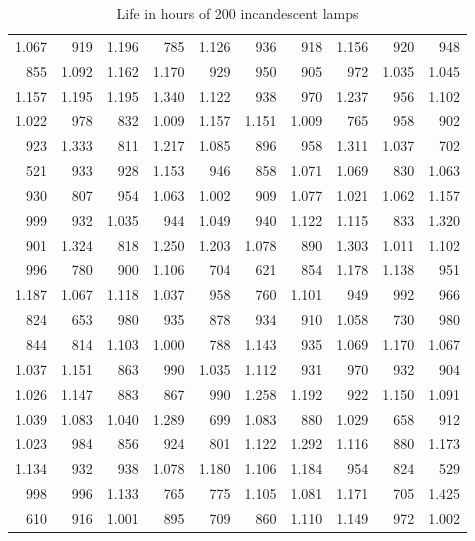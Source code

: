\begin{table}[H]
  \centering
  \begin{tabular}{rrrrrrrrrr}
    1.067 & 919   & 1.196 & 785   & 1.126 & 936   & 918   & 1.156 & 920   & 948   \\
    855   & 1.092 & 1.162 & 1.170 & 929   & 950   & 905   & 972   & 1.035 & 1.045 \\
    1.157 & 1.195 & 1.195 & 1.340 & 1.122 & 938   & 970   & 1.237 & 956   & 1.102 \\
    1.022 & 978   & 832   & 1.009 & 1.157 & 1.151 & 1.009 & 765   & 958   & 902   \\
    923   & 1.333 & 811   & 1.217 & 1.085 & 896   & 958   & 1.311 & 1.037 & 702   \\
    521   & 933   & 928   & 1.153 & 946   & 858   & 1.071 & 1.069 & 830   & 1.063 \\
    930   & 807   & 954   & 1.063 & 1.002 & 909   & 1.077 & 1.021 & 1.062 & 1.157 \\
    999   & 932   & 1.035 & 944   & 1.049 & 940   & 1.122 & 1.115 & 833   & 1.320 \\
    901   & 1.324 & 818   & 1.250 & 1.203 & 1.078 & 890   & 1.303 & 1.011 & 1.102 \\
    996   & 780   & 900   & 1.106 & 704   & 621   & 854   & 1.178 & 1.138 & 951   \\
    1.187 & 1.067 & 1.118 & 1.037 & 958   & 760   & 1.101 & 949   & 992   & 966   \\
    824   & 653   & 980   & 935   & 878   & 934   & 910   & 1.058 & 730   & 980   \\
    844   & 814   & 1.103 & 1.000 & 788   & 1.143 & 935   & 1.069 & 1.170 & 1.067 \\
    1.037 & 1.151 & 863   & 990   & 1.035 & 1.112 & 931   & 970   & 932   & 904   \\
    1.026 & 1.147 & 883   & 867   & 990   & 1.258 & 1.192 & 922   & 1.150 & 1.091 \\
    1.039 & 1.083 & 1.040 & 1.289 & 699   & 1.083 & 880   & 1.029 & 658   & 912   \\
    1.023 & 984   & 856   & 924   & 801   & 1.122 & 1.292 & 1.116 & 880   & 1.173 \\
    1.134 & 932   & 938   & 1.078 & 1.180 & 1.106 & 1.184 & 954   & 824   & 529   \\
    998   & 996   & 1.133 & 765   & 775   & 1.105 & 1.081 & 1.171 & 705   & 1.425 \\
    610   & 916   & 1.001 & 895   & 709   & 860   & 1.110 & 1.149 & 972   & 1.002 \\
  \end{tabular}
  \caption{Life in hours of 200 incandescent lamps}
  \label{tbl:file-in-hours-of-200-incandescent-lamps}
\end{table}
